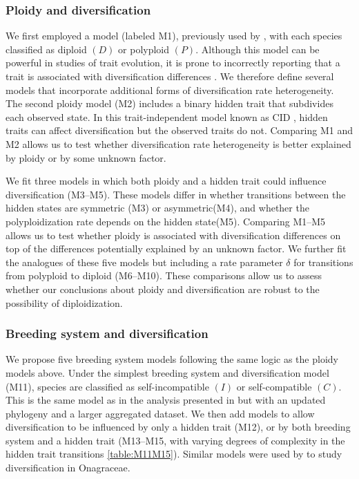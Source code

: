 \subsubsection{Ploidy and diversification}

We first employed a model (labeled M1), previously used by \citet{mayrose_2011}, with each species classified as diploid $(D)$ or polyploid $(P)$.
Although this model can be powerful in studies of trait evolution, it is prone to incorrectly reporting that a trait is associated with diversification differences \citep{maddison_2015, rabosky_2015}.
We therefore define several models that incorporate additional forms of diversification rate heterogeneity.
The second ploidy model (M2) includes a binary hidden trait that subdivides each observed state.
In this trait-independent model known as CID \citep{beaulieu_2016}, hidden traits can affect diversification but the observed traits do not.
Comparing M1 and M2 allows us to test whether diversification rate heterogeneity is better explained by ploidy or by some unknown factor.

We fit three models in which both ploidy and a hidden trait could influence diversification (M3--M5).
These models differ in whether transitions between the hidden states are symmetric (M3) or asymmetric(M4), and whether the polyploidization rate depends on the hidden state(M5). %
Comparing M1--M5 allows us to test whether ploidy is associated with diversification differences on top of the differences potentially explained by an unknown factor.
We further fit the analogues of these five models but including a rate parameter $\delta$ for transitions from polyploid to diploid (M6--M10).
These comparisons allow us to assess whether our conclusions about ploidy and diversification are robust to the possibility of diploidization.

\subsubsection{Breeding system and diversification}

We propose five breeding system models following the same logic as the ploidy models above.
Under the simplest breeding system and diversification model (M11), species are classified as self-incompatible $(I)$ or self-compatible $(C)$.
This is the same model as in the analysis presented in \citet{goldberg_2010} but with an updated phylogeny \citep{sarkinen_2013} and a larger aggregated dataset.
We then add models to allow diversification to be influenced by only a hidden trait (M12), or by both breeding system and a hidden trait (M13--M15, with varying degrees of complexity in the hidden trait transitions \cref{table:M11M15}).
Similar models were used by \citet{freyman_2019} to study diversification in Onagraceae.

